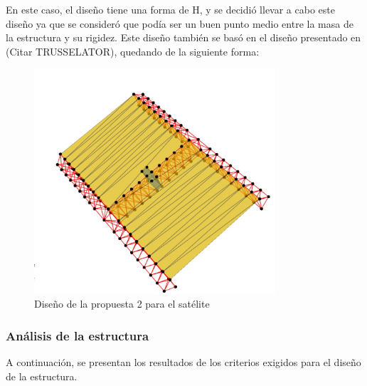En este caso, el diseño tiene una forma de H, y se decidió llevar a cabo este diseño ya que se consideró que podía ser un buen punto medio entre la masa de la estructura y su rigidez. Este diseño también se basó en el diseño presentado en (Citar TRUSSELATOR), quedando de la siguiente forma:

\begin{figure}[H]
    \centering
    \includegraphics[width=0.8\textwidth]{GRAFICOS_DISENO_BENO/propuesta2.png}
    \caption{Diseño de la propuesta 2 para el satélite}
    \label{fig:propuesta2}
\end{figure}

\subsubsection{Análisis de la estructura}

A continuación, se presentan los resultados de los criterios exigidos para el diseño de la estructura.

